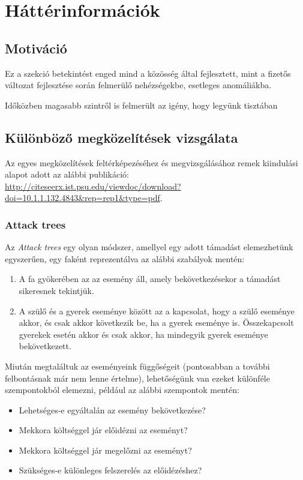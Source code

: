 \chapter{Háttérinformációk}

\section{Motiváció}
Ez a szekció betekintést enged mind a közösség által fejlesztett, mint a fizetős
 változat fejlesztése során felmerülő nehézségekbe, esetleges
anomáliákba.


Időközben magasabb szintről is felmerült az igény, hogy legyünk tisztában

\section{Különböző megközelítések vizsgálata}

Az egyes megközelítések feltérképezéséhez és megvizsgálásához remek kiindulási alapot adott az
alábbi publikáció: \url{http://citeseerx.ist.psu.edu/viewdoc/download?doi=10.1.1.132.4843&rep=rep1&type=pdf}.

\subsection{Attack trees}

Az \emph{Attack trees} egy olyan módszer, amellyel egy adott támadást elemezhetünk egyszerűen, egy
faként reprezentálva az alábbi szabályok mentén:
\begin{enumerate}
    \item A fa gyökerében az az esemény áll, amely bekövetkezésekor a támadást sikeresnek tekintjük.
    \item A szülő és a gyerek eseménye között az a kapcsolat, hogy a szülő eseménye akkor, és 
        csak akkor következik be, ha a gyerek eseménye is.
        Összekapcsolt gyerekek esetén akkor és csak akkor, ha mindegyik gyerek eseménye bekövetkezett.
\end{enumerate}
Miután megtaláltuk az eseményeink függőségeit (pontosabban a további felbontásnak már nem lenne
értelme), lehetőségünk van ezeket különféle szempontokból elemezni, például az alábbi szempontok mentén:
\begin{itemize}
    \item Lehetséges-e egyáltalán az esemény bekövetkezése?
    \item Mekkora költséggel jár előidézni az eseményt?
    \item Mekkora költséggel jár megelőzni az eseményt?
    \item Szükséges-e különleges felszerelés az előidézéshez?
\end{itemize}

